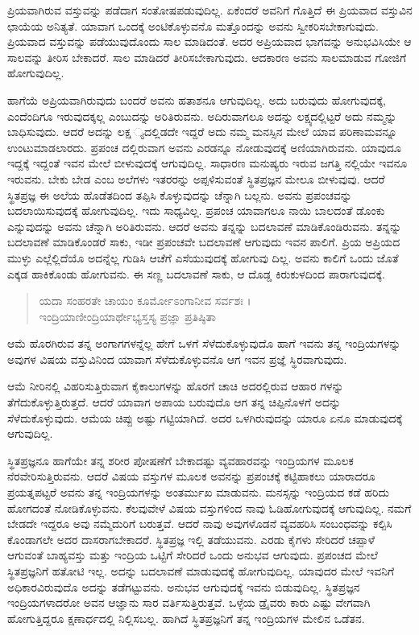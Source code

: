 ಪ್ರಿಯವಾಗಿರುವ ವಸ್ತುವನ್ನು ಪಡೆದಾಗ ಸಂತೋಷಪಡುವುದಿಲ್ಲ. ಏಕೆಂದರೆ ಅವನಿಗೆ ಗೊತ್ತಿದೆ ಈ ಪ್ರಿಯವಾದ ವಸ್ತುವಿನ ಛಾಯೆಯ ಅನಿತ್ಯತೆ. ಯಾವಾಗ ಒಂದಕ್ಕೆ ಅಂಟಿಕೊಳ್ಳುವನೊ ಮತ್ತೊಂದನ್ನು ಅವನು ಸ್ವೀಕರಿಸಬೇಕಾಗುವುದು. ಪ್ರಿಯವಾದ ವಸ್ತುವನ್ನು ಪಡೆಯುವುದೊಂದು ಸಾಲ ಮಾಡಿದಂತೆ. ಅದರ ಅಪ್ರಿಯವಾದ ಭಾಗವನ್ನು ಅನುಭವಿಸಿಯೇ ಆ ಸಾಲವನ್ನು ತೀರಿಸ ಬೇಕಾದರೆ. ಸಾಲ ಮಾಡಿದರೆ ತೀರಿಸಬೇಕಾಗುವುದು. ಆದಕಾರಣ ಅವನು ಸಾಲಮಾಡುವ ಗೋಜಿಗೆ ಹೋಗುವುದಿಲ್ಲ.

ಹಾಗೆಯೆ ಅಪ್ರಿಯವಾಗಿರುವುದು ಬಂದರೆ ಅವನು ಹತಾಶನೂ ಆಗುವುದಿಲ್ಲ. ಅದು ಬರುವುದು ಹೋಗುವುದಕ್ಕೆ, ಎಂದೆಂದಿಗೂ ಇರುವುದಕ್ಕಲ್ಲ ಎಂಬುದನ್ನು ಅರಿತಿರುವನು. ಅದಿರುವಾಗಲೂ ಅದನ್ನು ಲಕ್ಷ್ಯದಲ್ಲಿಟ್ಟರೆ ಅದು ನಮ್ಮನ್ನು ಬಾಧಿಸುವುದು. ಆದರೆ ಅದನ್ನು ಲಕ್ಷ ್ಯದಲ್ಲಿಡದೇ ಇದ್ದರೆ ಅದು ನಮ್ಮ ಮನಸ್ಸಿನ ಮೇಲೆ ಯಾವ ಪರಿಣಾಮವನ್ನೂ ಉಂಟುಮಾಡಲಾರದು. ಪ್ರಪಂಚ ದಲ್ಲಿರುವಾಗ ಅವನು ಎರಡನ್ನೂ ನೋಡುವುದಕ್ಕೆ ಅಣಿಯಾಗಿರುವನು. ಯಾವುದೂ ಇದ್ದಕ್ಕೆ ಇದ್ದಂತೆ ಇವನ ಮೇಲೆ ಬೀಳುವುದಕ್ಕೆ ಆಗುವುದಿಲ್ಲ. ಸಾಧಾರಣ ಮನುಷ್ಯರು ಇರುವ ಜಗತ್ತಿ ನಲ್ಲಿಯೇ ಇವನೂ ಇರುವನು. ಬೇಕು ಬೇಡ ಎಂಬ ಅಲೆಗಳು ಇತರರನ್ನು ಅಪ್ಪಳಿಸುವಂತೆ ಸ್ಥಿತಪ್ರಜ್ಞನ ಮೇಲೂ ಬೀಳುವುವು. ಆದರೆ ಸ್ಥಿತಪ್ರಜ್ಞ ಈ ಅಲೆಯ ಹೊಡೆತದಿಂದ ತಪ್ಪಿಸಿ ಕೊಳ್ಳುವುದನ್ನು ಚೆನ್ನಾಗಿ ಬಲ್ಲನು. ಅವನು ಪ್ರಪಂಚವನ್ನು ಬದಲಾಯಿಸುವುದಕ್ಕೆ ಹೋಗುವುದಿಲ್ಲ. ಇದು ಸಾಧ್ಯವಿಲ್ಲ. ಪ್ರಪಂಚ ಯಾವಾಗಲೂ ನಾಯಿ ಬಾಲದಂತೆ ಡೊಂಕು ಎನ್ನುವುದನ್ನು ಅವನು ಚೆನ್ನಾಗಿ ಅರಿತಿರುವನು. ಆದರೆ ಅವನು ತನ್ನನ್ನು ಬದಲಾವಣೆ ಮಾಡಿಕೊಂಡಿರುವನು. ತನ್ನನ್ನು ಬದಲಾವಣೆ ಮಾಡಿಕೊಂಡರೆ ಸಾಕು, ಇಡೀ ಪ್ರಪಂಚವೇ ಬದಲಾವಣೆ ಆಗುವುದು ಇವನ ಪಾಲಿಗೆ. ಪ್ರಿಯ ಅಪ್ರಿಯದ ಮುಳ್ಳು ಎಲ್ಲೆಲ್ಲಿದೆಯೊ ಅದನ್ನೆಲ್ಲ ಗುಡಿಸಿ ಆಚೆಗೆ ಎಸೆಯುವುದಕ್ಕೆ ಹೋಗುವು ದಿಲ್ಲ. ಅವನು ಕಾಲಿಗೆ ಒಂದು ಜೊತೆ ಎಕ್ಕಡ ಹಾಕಿಕೊಂಡು ಹೋಗುವನು. ಈ ಸಣ್ಣ ಬದಲಾವಣೆ ಸಾಕು, ಆ ದೊಡ್ಡ ಕಿರುಕುಳದಿಂದ ಪಾರಾಗುವುದಕ್ಕೆ.

\begin{verse}
ಯದಾ ಸಂಹರತೇ ಚಾಯಂ ಕೂರ್ಮೋಽಂಗಾನೀವ ಸರ್ವಶಃ ।\\ಇಂದ್ರಿಯಾಣೀಂದ್ರಿಯಾರ್ಥೇಭ್ಯಸ್ತಸ್ಯ ಪ್ರಜ್ಞಾ ಪ್ರತಿಷ್ಠಿತಾ 
\end{verse}

{\small ಆಮೆ ಹೊರಗಿರುವ ತನ್ನ ಅಂಗಾಗಗಳನ್ನೆಲ್ಲ ಹೇಗೆ ಒಳಗೆ ಸೆಳೆದುಕೊಳ್ಳುವುದೊ ಹಾಗೆ ಇವನು ತನ್ನ ಇಂದ್ರಿಯಗಳನ್ನು ಅವುಗಳ ವಿಷಯ ವಸ್ತುವಿನಿಂದ ಯಾವಾಗ ಸೆಳೆದುಕೊಳ್ಳುವನೊ ಆಗ ಇವನ ಪ್ರಜ್ಞೆ ಸ್ಥಿರವಾಗುವುದು.}

ಆಮೆ ನೀರಿನಲ್ಲಿ ವಿಹರಿಸುತ್ತಿರುವಾಗ ಕೈಕಾಲುಗಳನ್ನು ಹೊರಗೆ ಚಾಚಿ ಅದರಲ್ಲಿರುವ ಆಹಾರ ಗಳನ್ನು ತೆಗೆದುಕೊಳ್ಳುತ್ತಿರುತ್ತದೆ. ಆದರೆ ಯಾವಾಗ ಅಪಾಯ ಬರುವುದೊ ಆಗ ತನ್ನ ಚಿಪ್ಪಿನೊಳಗೆ ಅದನ್ನು ಸೆಳೆದುಕೊಳ್ಳುವುದು. ಆಮೆಯ ಚಿಪ್ಪು ಅಷ್ಟು ಗಟ್ಟಿಯಾಗಿದೆ. ಅದರ ಒಳಗಿರುವುದನ್ನು ಯಾರೂ ಏನೂ ಮಾಡುವುದಕ್ಕೆ ಆಗುವುದಿಲ್ಲ.

ಸ್ಥಿತಪ್ರಜ್ಞನೂ ಹಾಗೆಯೇ ತನ್ನ ಶರೀರ ಪೋಷಣೆಗೆ ಬೇಕಾದಷ್ಟು ವ್ಯವಹಾರವನ್ನು ಇಂದ್ರಿಯಗಳ ಮೂಲಕ ನೆರವೇರಿಸುತ್ತಿರುವನು. ಆದರೆ ವಿಷಯ ವಸ್ತುಗಳ ಮೂಲಕ ಅವನನ್ನು ಪ್ರಪಂಚಕ್ಕೆ ಕಟ್ಟಿಹಾಕಲು ಯಾರಾದರೂ ಪ್ರಯತ್ನಪಟ್ಟರೆ ಅವನು ತನ್ನ ಇಂದ್ರಿಯಗಳನ್ನು ಅಂತರ್ಮುಖ ಮಾಡುವನು. ಮನಸ್ಸನ್ನು ಇಂದ್ರಿಯದ ಕಡೆ ಹರಿದು ಹೋಗದಂತೆ ನೋಡಿಕೊಳ್ಳುವನು. ಕೆಲವುವೇಳೆ ವಿಷಯ ವಸ್ತುಗಳಿಂದ ನಾವು ಓಡಿಹೋಗುವುದಕ್ಕೆ ಆಗುವುದಿಲ್ಲ. ನಮಗೆ ಬೇಡದೇ ಇದ್ದರೂ ಅವು ನಮ್ಮೆದುರಿಗೆ ಬರುತ್ತವೆ. ಆದರೆ ನಾವು ಅವುಗಳೊಡನೆ ವ್ಯವಹರಿಸಿ ಸಂಬಂಧವನ್ನು ಕಲ್ಪಿಸಿ ಕೊಂಡಾಗಲೇ ಅದರ ದಾಸರಾಗಬೇಕಾದರೆ. ಸ್ಥಿತಪ್ರಜ್ಞ ಇಲ್ಲಿ ತಡೆಯುವನು. ಎರಡು ಕೈಗಳು ಸೇರಿದರೆ ಚಪ್ಪಾಳೆ ಆಗುವಂತೆ ಬಾಹ್ಯವಸ್ತು ಮತ್ತು ಇಂದ್ರಿಯ ಒಟ್ಟಿಗೆ ಸೇರಿದರೆ ಒಂದು ಅನುಭವ ಆಗುವುದು. ಪ್ರಪಂಚದ ಮೇಲೆ ಸ್ಥಿತಪ್ರಜ್ಞನಿಗೆ ಹತೋಟಿ ಇಲ್ಲ. ಅದನ್ನು ಬದಲಾವಣೆ ಮಾಡುವುದಕ್ಕೆ ಹೋಗುವುದಿಲ್ಲ. ಯಾವುದರ ಮೇಲೆ ಇವನಿಗೆ ಅಧಿಕಾರವಿರುವುದೊ ಅದನ್ನು ತಡೆಗಟ್ಟುವನು. ಅನುಭವ ಆಗುವುದಕ್ಕೆ ಇವನು ಬಿಡುವುದಿಲ್ಲ. ಸ್ಥಿತಪ್ರಜ್ಞನ ಇಂದ್ರಿಯಗಳಾದರೋ ಅವನ ಆಜ್ಞಾನು ಸಾರ ವರ್ತಿಸುತ್ತಿರುತ್ತವೆ. ಒಳ್ಳೆಯ ಡ್ರೈವರು ಕಾರು ಎಷ್ಟು ವೇಗವಾಗಿ ಹೋಗುತ್ತಿದ್ದರೂ ಕ್ಷಣಾರ್ಧದಲ್ಲಿ ನಿಲ್ಲಿಸಬಲ್ಲ. ಹಾಗಿದೆ ಸ್ಥಿತಪ್ರಜ್ಞನಿಗೆ ತನ್ನ ಇಂದ್ರಿಯಗಳ ಮೇಲಿನ ಒಡೆತನ.

